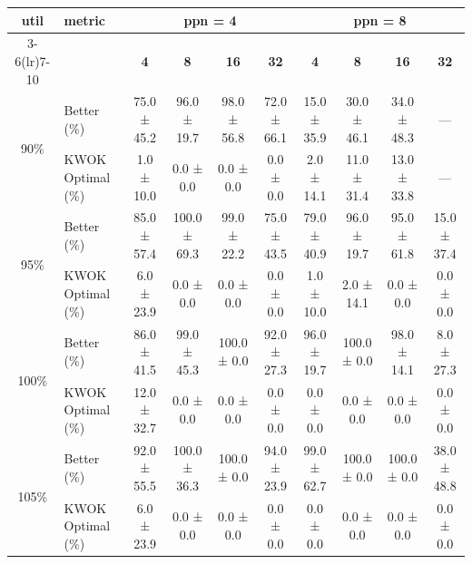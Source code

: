 \begin{tabular}{@{}c l *{8}{c}@{}}
\toprule
\multirow{2}{*}{\textbf{util}} & \multirow{2}{*}{\textbf{metric}} &\multicolumn{4}{c}{\textbf{ppn = 4}} & \multicolumn{4}{c}{\textbf{ppn = 8}}\\
\cmidrule(lr){3-6}\cmidrule(lr){7-10}
 &  & \textbf{4} & \textbf{8} & \textbf{16} & \textbf{32} & \textbf{4} & \textbf{8} & \textbf{16} & \textbf{32}\\
\midrule
\multirow{2}{*}{90\%}
& Better\,(\%) & 75.0 ± 45.2 & 96.0 ± 19.7 & 98.0 ± 56.8 & 72.0 ± 66.1 & 15.0 ± 35.9 & 30.0 ± 46.1 & 34.0 ± 48.3 & \multicolumn{1}{c}{—} \\
& KWOK\,Optimal\,(\%) & 1.0 ± 10.0 & 0.0 ± 0.0 & 0.0 ± 0.0 & 0.0 ± 0.0 & 2.0 ± 14.1 & 11.0 ± 31.4 & 13.0 ± 33.8 & \multicolumn{1}{c}{—} \\
\midrule
\multirow{2}{*}{95\%}
& Better\,(\%) & 85.0 ± 57.4 & 100.0 ± 69.3 & 99.0 ± 22.2 & 75.0 ± 43.5 & 79.0 ± 40.9 & 96.0 ± 19.7 & 95.0 ± 61.8 & 15.0 ± 37.4 \\
& KWOK\,Optimal\,(\%) & 6.0 ± 23.9 & 0.0 ± 0.0 & 0.0 ± 0.0 & 0.0 ± 0.0 & 1.0 ± 10.0 & 2.0 ± 14.1 & 0.0 ± 0.0 & 0.0 ± 0.0 \\
\midrule
\multirow{2}{*}{100\%}
& Better\,(\%) & 86.0 ± 41.5 & 99.0 ± 45.3 & 100.0 ± 0.0 & 92.0 ± 27.3 & 96.0 ± 19.7 & 100.0 ± 0.0 & 98.0 ± 14.1 & 8.0 ± 27.3 \\
& KWOK\,Optimal\,(\%) & 12.0 ± 32.7 & 0.0 ± 0.0 & 0.0 ± 0.0 & 0.0 ± 0.0 & 0.0 ± 0.0 & 0.0 ± 0.0 & 0.0 ± 0.0 & 0.0 ± 0.0 \\
\midrule
\multirow{2}{*}{105\%}
& Better\,(\%) & 92.0 ± 55.5 & 100.0 ± 36.3 & 100.0 ± 0.0 & 94.0 ± 23.9 & 99.0 ± 62.7 & 100.0 ± 0.0 & 100.0 ± 0.0 & 38.0 ± 48.8 \\
& KWOK\,Optimal\,(\%) & 6.0 ± 23.9 & 0.0 ± 0.0 & 0.0 ± 0.0 & 0.0 ± 0.0 & 0.0 ± 0.0 & 0.0 ± 0.0 & 0.0 ± 0.0 & 0.0 ± 0.0 \\
\bottomrule
\end{tabular}
